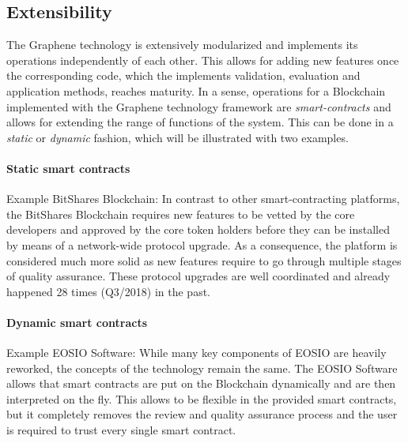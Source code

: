 \subsection{Extensibility }

The Graphene technology is extensively modularized and implements its operations independently of each other. This allows for adding new features once the corresponding code, which the implements validation, evaluation and application methods, reaches maturity. In a sense, operations for a Blockchain implemented with the Graphene technology framework are \emph{smart-contracts} and allows for extending the range of functions of the system. This can be done in a \emph{static} or \emph{dynamic} fashion, which will be illustrated with two examples.

\paragraph{Static smart contracts} Example BitShares Blockchain: In contrast to other smart-contracting platforms, the BitShares Blockchain requires new features to be vetted by the core developers and approved by the core token holders before they can be installed by means of a network-wide protocol upgrade. As a consequence, the platform is considered much more solid as new features require to go through multiple stages of quality assurance. These protocol upgrades are well coordinated and already happened 28 times (Q3/2018) in the past.

\paragraph{Dynamic smart contracts} Example EOSIO Software: While many key components of EOSIO are heavily reworked, the concepts of the technology remain the same. The EOSIO Software allows that smart contracts are put on the Blockchain dynamically and are then interpreted on the fly. This allows to be flexible in the provided smart contracts, but it completely removes the review and quality assurance process and the user is required to trust every single smart contract.

